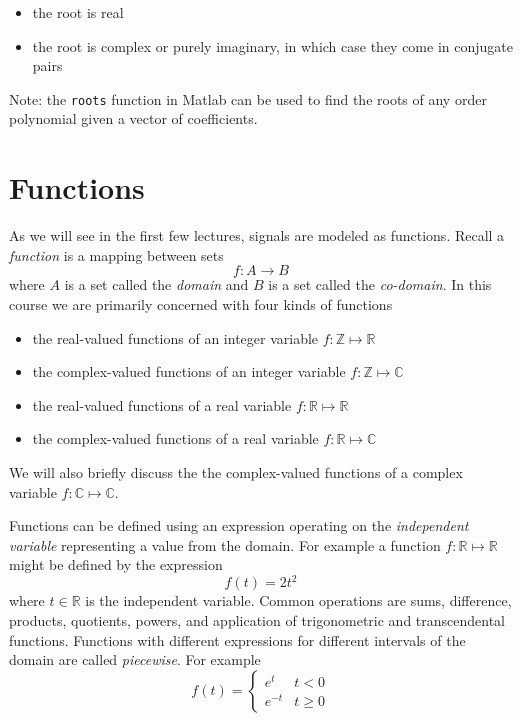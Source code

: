 \begin{itemize}
\item the root is real
\item the root is complex or purely imaginary, in which case they come in conjugate pairs 
\end{itemize}

Note: the \texttt{roots} function in Matlab can be used to find the roots of any order polynomial given a vector of coefficients.

\section{Functions}

As we will see in the first few lectures, signals are modeled as functions. Recall a \textit{function} is a mapping between sets
\[
f: A \rightarrow B
\]
where $A$ is a set called the {\it domain} and $B$ is a set called the {\it co-domain}. In this course we are primarily concerned with four kinds of functions

\begin{itemize}
\item the real-valued functions of an integer variable $f:\mathbb{Z}\mapsto\mathbb{R}$
\item the complex-valued functions of an integer variable $f:\mathbb{Z}\mapsto\mathbb{C}$
\item the real-valued functions of a real variable $f:\mathbb{R}\mapsto\mathbb{R}$
\item the complex-valued functions of a real variable $f:\mathbb{R}\mapsto\mathbb{C}$
\end{itemize}
We will also briefly discuss the the complex-valued functions of a complex variable $f:\mathbb{C}\mapsto\mathbb{C}$.

Functions can be defined using an expression operating on the \textit{independent variable} representing a value from the domain. For example a function $f:\mathbb{R}\mapsto\mathbb{R}$ might be defined by the expression
\[
f(t) = 2t^2
\]
where $t\in\mathbb{R}$ is the independent variable. Common operations are sums, difference, products, quotients, powers, and application of trigonometric and transcendental functions. Functions with different expressions for different intervals of the domain are called \textit{piecewise}. For example
\[
f(t) = \left\{ \begin{array}{cc}
   e^{t} & t < 0\\
   e^{-t} & t \geq 0
\end{array}
\right.
\]


